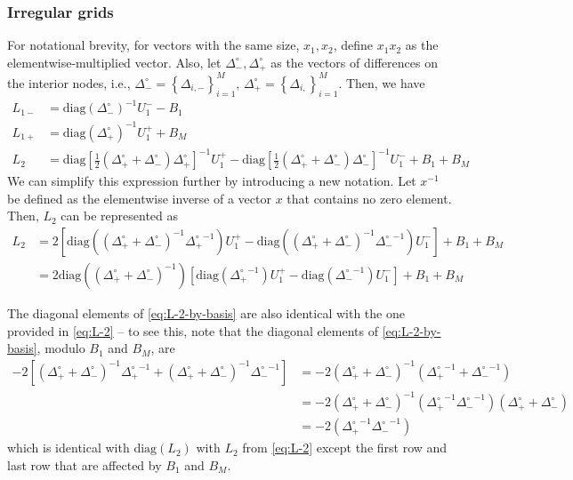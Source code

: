 \documentclass[11pt]{article}
\newcommand{\set}[1]{\ensuremath{\left\{{#1}\right\}}}
\theoremstyle{definition}
\begin{document}
\subsubsection{Irregular grids}
For notational brevity, for vectors with the same size, $x_1, x_2$, define $x_1 x_2$ as the elementwise-multiplied vector. Also, let $\Delta_-^\circ, \Delta_+^\circ$ as the vectors of differences on the interior nodes, i.e., $\Delta_{-}^\circ = \set{\Delta_{i,-}}_{i=1}^M$, $\Delta_{+}^\circ = \set{\Delta_{i,}}_{i=1}^M$. Then, we have
\begin{align}
L_{1-} &= \text{diag}(\Delta_{-}^{\circ} )^{-1} U_1^{-} - B_1 \\
L_{1+} &= \text{diag}(\Delta_{+}^{\circ} )^{-1} U_1^{+} + B_{M} \\
L_2 &= \text{diag} \left[ \frac{1}{2} ( {\Delta_{+}^{\circ}} + {\Delta_{-}^{\circ}} ) {\Delta_{+}^{\circ}} \right]^{-1}  U_1^{+} -
\text{diag} \left[ \frac{1}{2} ( {\Delta_{+}^{\circ}} + {\Delta_{-}^{\circ}} ) {\Delta_{-}^{\circ}} \right]^{-1}  U_1^{-}
+ B_1 + B_{M}
\end{align}
We can simplify this expression further by introducing a new notation. Let $x^{-1}$ be defined as the elementwise inverse of a vector $x$ that contains no zero element. Then, $L_2$ can be represented as
\begin{align}
L_2 &=
2\left[ \text{diag} \left( ( {\Delta_{+}^{\circ}} + {\Delta_{-}^{\circ}} )^{-1} {\Delta_{+}^{\circ}}^{-1} \right) U_1^{+} -
\text{diag} \left( ( {\Delta_{+}^{\circ}} + {\Delta_{-}^{\circ}} )^{-1} {\Delta_{-}^{\circ}}^{-1} \right) U_1^{-}  \right]
+ B_1 + B_{M} \\ \label{eq:L-2-by-basis}
&= 2 \text{diag} \left( ( {\Delta_{+}^{\circ}} + {\Delta_{-}^{\circ}} )^{-1} \right) \left[ \text{diag} \left(  {\Delta_{+}^{\circ}}^{-1} \right) U_1^{+} -
\text{diag} \left(  {\Delta_{-}^{\circ}}^{-1} \right) U_1^{-}  \right]
+ B_1 + B_{M}
\end{align}


The diagonal elements of \eqref{eq:L-2-by-basis} are also identical with the one provided in \eqref{eq:L-2} -- to see this, note that the diagonal elements of \eqref{eq:L-2-by-basis}, modulo $B_1$ and $B_{M}$, are
\begin{align}
-2 \left[ ({\Delta_{+}^{\circ}} + {\Delta_{-}^{\circ}})^{-1} {\Delta_{+}^{\circ}}^{-1} + ({\Delta_{+}^{\circ}} + {\Delta_{-}^{\circ}})^{-1} {\Delta_{-}^{\circ}}^{-1} \right] &= -2 ({\Delta_{+}^{\circ}} + {\Delta_{-}^{\circ}})^{-1}  ( {\Delta_{+}^{\circ}}^{-1} + {\Delta_{-}^{\circ}}^{-1} ) \\
&= -2({\Delta_{+}^{\circ}} + {\Delta_{-}^{\circ}})^{-1} ({\Delta_{+}^{\circ}}^{-1} {\Delta_{-}^{\circ}}^{-1}) ({\Delta_{+}^{\circ}} + {\Delta_{-}^{\circ}} )  \\
&= -2 ({\Delta_{+}^{\circ}}^{-1} {\Delta_{-}^{\circ}}^{-1})
\end{align}
which is identical with $\text{diag} (L_2)$ with $L_2$ from \eqref{eq:L-2} except the first row and last row that are affected by $B_1$ and $B_{M}$.

\fi



\end{document}
